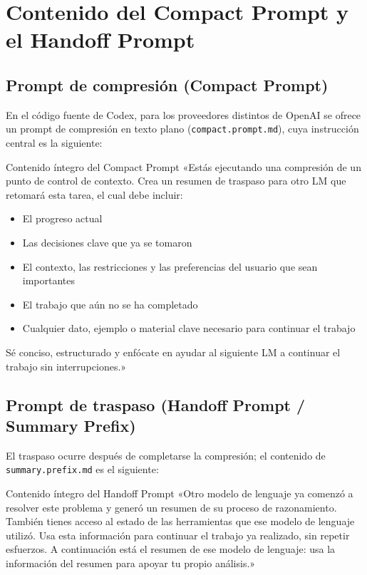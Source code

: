 \documentclass[a4paper]{article}
\begin{document}
\section{Contenido del Compact Prompt y el Handoff Prompt}

\subsection{Prompt de compresión (Compact Prompt)}

En el código fuente de Codex, para los proveedores distintos de OpenAI se ofrece un prompt de compresión en texto plano (\texttt{compact.prompt.md}), cuya instrucción central es la siguiente:

\begin{importantbox}{Contenido íntegro del Compact Prompt}
«Estás ejecutando una compresión de un punto de control de contexto. Crea un resumen de traspaso para otro LM que retomará esta tarea, el cual debe incluir:
\begin{itemize}
    \item El progreso actual
    \item Las decisiones clave que ya se tomaron
    \item El contexto, las restricciones y las preferencias del usuario que sean importantes
    \item El trabajo que aún no se ha completado
    \item Cualquier dato, ejemplo o material clave necesario para continuar el trabajo
\end{itemize}
Sé conciso, estructurado y enfócate en ayudar al siguiente LM a continuar el trabajo sin interrupciones.»
\end{importantbox}

\subsection{Prompt de traspaso (Handoff Prompt / Summary Prefix)}

El traspaso ocurre después de completarse la compresión; el contenido de \texttt{summary.prefix.md} es el siguiente:

\begin{importantbox}{Contenido íntegro del Handoff Prompt}
«Otro modelo de lenguaje ya comenzó a resolver este problema y generó un resumen de su proceso de razonamiento. También tienes acceso al estado de las herramientas que ese modelo de lenguaje utilizó. Usa esta información para continuar el trabajo ya realizado, sin repetir esfuerzos. A continuación está el resumen de ese modelo de lenguaje: usa la información del resumen para apoyar tu propio análisis.»
\end{importantbox}
\end{document}
